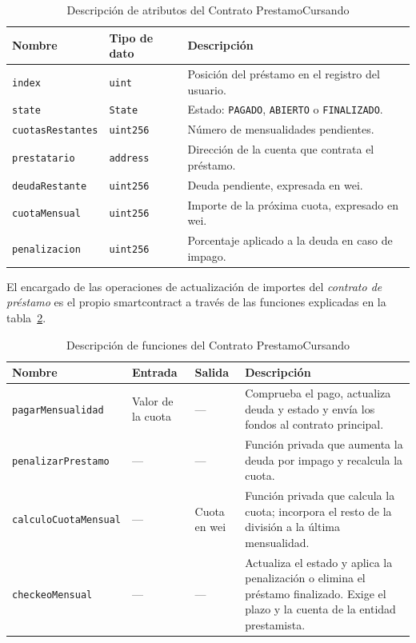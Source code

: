 \begin{table}[H]
\centering
\caption{Descripción de atributos del Contrato PrestamoCursando }
\label{fig:atributosprestamo}
\small
\begin{tabular}{|p{3.4cm}|p{2.5cm}|p{7cm}|}
\hline
\rowcolor[HTML]{D0E7FF}
Nombre & Tipo de dato & Descripción \\ \hline
\texttt{index} & \texttt{uint} & Posición del préstamo en el registro del usuario. \\ \hline
\texttt{state} & \texttt{State} & Estado: \texttt{PAGADO}, \texttt{ABIERTO} o \texttt{FINALIZADO}. \\ \hline
\texttt{cuotas\allowbreak{}Restantes} & \texttt{uint256} & Número de mensualidades pendientes. \\ \hline
\texttt{prestatario} & \texttt{address} & Dirección de la cuenta que contrata el préstamo. \\ \hline
\texttt{deudaRestante} & \texttt{uint256} & Deuda pendiente, expresada en wei. \\ \hline
\texttt{cuotaMensual} & \texttt{uint256} & Importe de la próxima cuota, expresado en wei. \\ \hline
\texttt{penalizacion} & \texttt{uint256} & Porcentaje aplicado a la deuda en caso de impago. \\ \hline
\end{tabular}
\end{table}

El encargado de las operaciones de actualización de importes del \textit{contrato de préstamo}
es el propio \gls{smartcontract} a través de las funciones explicadas en la tabla~\ref{fig:funcionesprestamo}.

\begin{table}[H]
\centering
\caption{Descripción de funciones del Contrato PrestamoCursando }
    \label{fig:funcionesprestamo}
\small
\begin{tabular}{|p{4.2cm}|p{2cm}|p{2cm}|p{4.8cm}|}
\hline
\rowcolor[HTML]{D0E7FF}
Nombre & Entrada & Salida & Descripción \\ \hline
\texttt{pagarMensualidad} & Valor de la cuota & --- & Comprueba el pago, actualiza deuda y estado y envía los fondos al contrato principal. \\ \hline
\texttt{penalizarPrestamo} & --- & --- & Función privada que aumenta la deuda por impago y recalcula la cuota. \\ \hline
\texttt{calculo\allowbreak{}Cuota\allowbreak{}Mensual} & --- & Cuota en wei & Función privada que calcula la cuota; incorpora el resto de la división a la última mensualidad. \\ \hline
\texttt{checkeoMensual} & --- & --- & Actualiza el estado y aplica la penalización o elimina el préstamo finalizado. Exige el plazo y la cuenta de la entidad prestamista. \\ \hline
\end{tabular}
\end{table}

